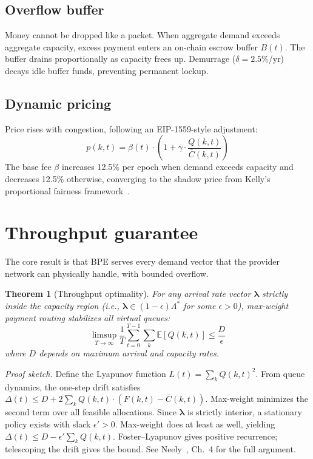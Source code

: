 \documentclass[10pt,twocolumn]{article}
\newtheorem{theorem}{Theorem}
\newcommand{\Csmooth}{\bar{C}}
\begin{document}
\subsection{Overflow buffer}

Money cannot be dropped like a packet. When aggregate demand exceeds aggregate
capacity, excess payment enters an on-chain escrow buffer $B(t)$. The buffer
drains proportionally as capacity frees up. Demurrage ($\delta = 2.5\%$/yr)
decays idle buffer funds, preventing permanent lockup.

\subsection{Dynamic pricing}

Price rises with congestion, following an EIP-1559-style adjustment:
\begin{equation}
p(k,t) = \beta(t) \cdot \left(1 + \gamma \cdot \frac{Q(k,t)}{\Csmooth(k,t)}\right)
\end{equation}
The base fee $\beta$ increases 12.5\% per epoch when demand exceeds capacity and
decreases 12.5\% otherwise, converging to the shadow price from Kelly's
proportional fairness framework~\cite{kelly1998rate}.


\section{Throughput guarantee}

The core result is that BPE serves every demand vector that the provider
network can physically handle, with bounded overflow.

\begin{theorem}[Throughput optimality]
\label{thm:main}
For any arrival rate vector $\boldsymbol{\lambda}$ strictly inside the capacity
region (i.e., $\boldsymbol{\lambda} \in (1-\epsilon)\Lambda^{*}$ for some
$\epsilon > 0$), max-weight payment routing stabilizes all virtual queues:
\begin{equation}
\limsup_{T \to \infty} \frac{1}{T} \sum_{t=0}^{T-1} \sum_{k}
\mathbb{E}[Q(k,t)] \leq \frac{D}{\epsilon}
\end{equation}
where $D$ depends on maximum arrival and capacity rates.
\end{theorem}

\textit{Proof sketch.} Define the Lyapunov function $L(t) = \sum_k Q(k,t)^2$.
From queue dynamics, the one-step drift satisfies
$\Delta(t) \leq D + 2\sum_k Q(k,t) \cdot (F(k,t) - \Csmooth(k,t))$.
Max-weight minimizes the second term over all feasible allocations. Since
$\boldsymbol{\lambda}$ is strictly interior, a stationary policy exists with
slack $\epsilon' > 0$. Max-weight does at least as well, yielding
$\Delta(t) \leq D - \epsilon' \sum_k Q(k,t)$. Foster--Lyapunov gives
positive recurrence; telescoping the drift gives the bound.
See Neely~\cite{neely2010stochastic}, Ch.~4 for the full argument.
\end{document}
